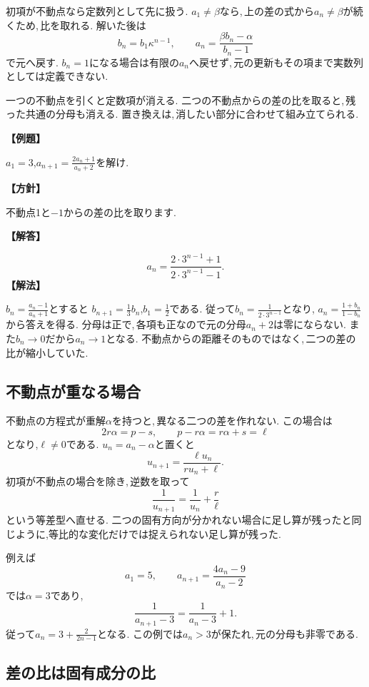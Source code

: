 初項が不動点なら定数列として先に扱う.
$a_1\ne\beta$なら,\,上の差の式から$a_n\ne\beta$が続くため,\,比を取れる.
解いた後は
\[
 b_n=b_1\kappa^{n-1},\qquad
 a_n=\frac{\beta b_n-\alpha}{b_n-1}
\]
で元へ戻す.
$b_n=1$になる場合は有限の$a_n$へ戻せず,\,元の更新もその項まで実数列としては定義できない.

\begin{bookpoint}
一つの不動点を引くと定数項が消える.
二つの不動点からの差の比を取ると,\,残った共通の分母も消える.
置き換えは,\,消したい部分に合わせて組み立てられる.
\end{bookpoint}

\noindent\textbf{【例題】}\par\nobreak
$a_1=3$,$a_{n+1}=\frac{2a_n+1}{a_n+2}$を解け.

\noindent\textbf{【方針】}\par\nobreak
不動点1と$-1$からの差の比を取ります.

\noindent\textbf{【解答】}\par\nobreak
\[
 a_n=\frac{2\cdot3^{n-1}+1}{2\cdot3^{n-1}-1}.
\]
\noindent\textbf{【解法】}\par\nobreak
$b_n=\frac{a_n-1}{a_n+1}$とすると
$b_{n+1}=\frac13b_n$,$b_1=\frac12$である.
従って$b_n=\frac1{2\cdot3^{n-1}}$となり,
$a_n=\frac{1+b_n}{1-b_n}$から答えを得る.
分母は正で,\,各項も正なので元の分母$a_n+2$は零にならない.
また$b_n\to0$だから$a_n\to1$となる.
不動点からの距離そのものではなく,\,二つの差の比が縮小していた.

\subsection{不動点が重なる場合}

不動点の方程式が重解$\alpha$を持つと,\,異なる二つの差を作れない.
この場合は
\[
 2r\alpha=p-s,\qquad
 p-r\alpha=r\alpha+s=\ell
\]
となり,$\ell\ne0$である.
$u_n=a_n-\alpha$と置くと
\[
 u_{n+1}=\frac{\ell u_n}{ru_n+\ell}.
\]
初項が不動点の場合を除き,\,逆数を取って
\[
 \frac1{u_{n+1}}=\frac1{u_n}+\frac r\ell
\]
という等差型へ直せる.
二つの固有方向が分かれない場合に足し算が残ったと同じように,等比的な変化だけでは捉えられない足し算が残った.

例えば
\[
 a_1=5,\qquad a_{n+1}=\frac{4a_n-9}{a_n-2}
\]
では$\alpha=3$であり,
\[
 \frac1{a_{n+1}-3}=\frac1{a_n-3}+1.
\]
従って$a_n=3+\frac2{2n-1}$となる.
この例では$a_n>3$が保たれ,\,元の分母も非零である.

\subsection{差の比は固有成分の比}

